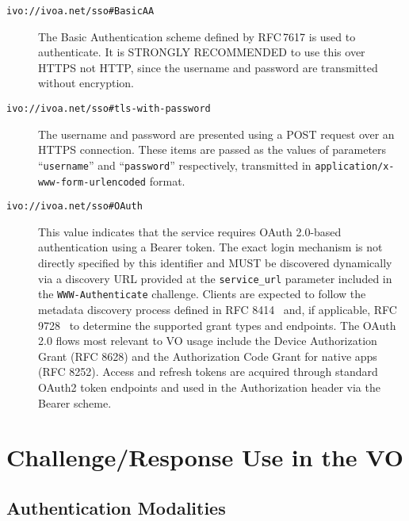 \documentclass[11pt,a4paper]{ivoa}
\newcommand{\rfc}[1]{RFC\,#1}
\begin{document}
\begin{description}
  \item[{\tt ivo://ivoa.net/sso\#BasicAA}]
        The Basic Authentication scheme defined by \rfc{7617} is used to
        authenticate.
        It is STRONGLY RECOMMENDED to use this over HTTPS not HTTP,
        since the username and password are transmitted without encryption.
  \item[{\tt ivo://ivoa.net/sso\#tls-with-password}]
        The username and password are presented using a POST request
        over an HTTPS connection.
        These items are passed as the values of parameters
        ``{\tt username}'' and ``{\tt password}'' respectively,
        transmitted in {\tt application/x-www-form-urlencoded} format.

  \item[{\tt ivo://ivoa.net/sso\#OAuth}]
        This value indicates that the service requires OAuth 2.0-based authentication
        using a Bearer token. The exact login mechanism is not directly specified by
        this identifier and MUST be discovered dynamically via a discovery URL provided at the
        \texttt{service\_url}
        parameter included in the \texttt{WWW-Authenticate} challenge. Clients are expected
        to follow the metadata discovery process defined in RFC 8414~\citep{rfc8414} and,
        if applicable, RFC 9728~\citep{rfc9728} to determine the supported grant types and endpoints.
        The OAuth 2.0 flows most relevant to VO usage include the Device Authorization Grant (RFC 8628)
        and the Authorization Code Grant for native apps (RFC 8252). Access and refresh tokens are acquired
        through standard OAuth2 token endpoints and used in the Authorization header via the Bearer scheme.

\end{description}





\section{Challenge/Response Use in the VO}
\label{sec:cr-use}

\subsection{Authentication Modalities}
\label{sec:modalities}
\end{document}
